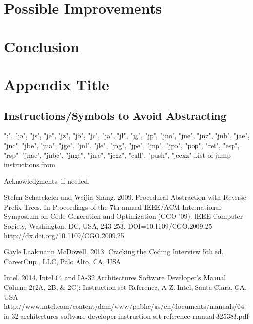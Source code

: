 \documentclass[9pt,nocopyrightspace]{sigplanconf}
\begin{document}
\section{Possible Improvements}

\section{Conclusion}

\appendix
\section{Appendix Title}

\subsection{Instructions/Symbols to Avoid Abstracting}
":", "jo", "js", "je", "jz", "jb", "jc", "ja", "jl", "jg", "jp", "jno", "jne", "jnz", "jnb", "jae", "jnc", "jbe", "jna", "jge", "jnl", "jle", "jng", "jpe", "jnp", "jpo", "pop", "ret", "esp", "rsp", "jnae", "jnbe", "jnge", "jnle", "jcxz", "call", "push", "jecxz"
List of jump instructions from \cite{intel01}

\acks

Acknowledgments, if needed.





\begin{thebibliography}{}
\softraggedright

Stefan Schaeckeler and Weijia Shang. 2009. Procedural Abstraction with Reverse Prefix Trees. In Proceedings of the 7th annual IEEE/ACM International Symposium on Code Generation and Optimization (CGO '09). IEEE Computer Society, Washington, DC, USA, 243-253. DOI=10.1109/CGO.2009.25 http://dx.doi.org/10.1109/CGO.2009.25

Gayle Laakmann McDowell. 2013. Cracking the Coding Interview 5th ed. CareerCup , LLC, Palo Alto, CA, USA

Intel. 2014. Intel 64 and IA-32 Architectures Software Developer's Manual Colume 2(2A, 2B, \& 2C): Instruction set Reference, A-Z. Intel, Santa Clara, CA, USA http://www.intel.com/content/dam/www/public/us/en/documents/manuals/64-ia-32-architectures-software-developer-instruction-set-reference-manual-325383.pdf

\end{thebibliography}
\end{document}
